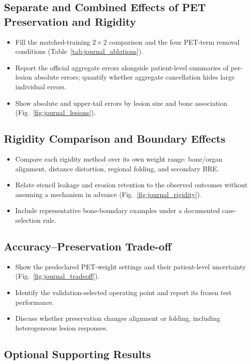 \begin{journaladdition}
\subsection{Separate and Combined Effects of PET Preservation and Rigidity}
\label{sec:ablation}
\begin{itemize}
  \item Fill the matched-training $2\times2$ comparison and the four PET-term removal conditions (Table~\ref{tab:journal_ablations}).
  \item Report the official aggregate errors alongside patient-level summaries of per-lesion absolute errors; quantify whether aggregate cancellation hides large individual errors.
  \item Show absolute and upper-tail errors by lesion size and bone association (Fig.~\ref{fig:journal_lesions}).
\end{itemize}
\end{journaladdition}



\begin{journaladdition}
\subsection{Rigidity Comparison and Boundary Effects}
\begin{itemize}
  \item Compare each rigidity method over its own weight range: bone/organ alignment, distance distortion, regional folding, and secondary BRE.
  \item Relate stencil leakage and erosion retention to the observed outcomes without assuming a mechanism in advance (Fig.~\ref{fig:journal_rigidity}).
  \item Include representative bone-boundary examples under a documented case-selection rule.
\end{itemize}
\end{journaladdition}


\begin{journaladdition}
\subsection{Accuracy--Preservation Trade-off}
\begin{itemize}
  \item Show the predeclared PET-weight settings and their patient-level uncertainty (Fig.~\ref{fig:journal_tradeoff}).
  \item Identify the validation-selected operating point and report its frozen test performance.
  \item Discuss whether preservation changes alignment or folding, including heterogeneous lesion responses.
\end{itemize}
\end{journaladdition}


\begin{journaladdition}
\subsection{Optional Supporting Results}
\end{journaladdition}
